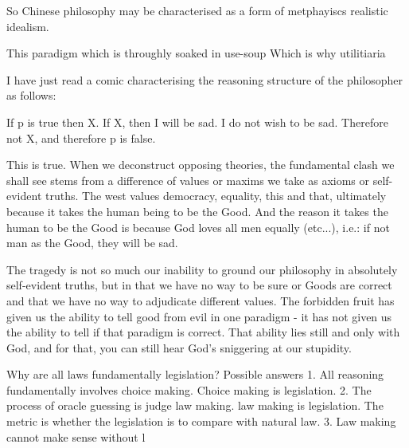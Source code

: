 So Chinese philosophy may be characterised as a form of metphayiscs realistic idealism. 








This paradigm which is throughly soaked in use-soup Which is why utilitiaria





I have just read a comic characterising the reasoning structure of the philosopher as follows: 

If p is true then X. 
If X, then I will be sad. 
I do not wish to be sad. 
Therefore not X, and therefore p is false. 

This is true. When we deconstruct opposing theories, the fundamental clash we shall see stems from a difference of values or maxims we take as axioms or self-evident truths. The west values democracy, equality, this and that, ultimately because it takes the human being to be the Good. And the reason it takes the human to be the Good is because God loves all men equally (etc...), i.e.: if not man as the Good, they will be sad. 

The tragedy is not so much our inability to ground our philosophy in absolutely self-evident truths, but in that we have no way to be sure or Goods are correct and that we have no way to adjudicate different values. The forbidden fruit has given us the ability to tell good from evil in one paradigm - it has not given us the ability to tell if that paradigm is correct. That ability lies still and only with God, and for that, you can still hear God's sniggering at our stupidity. 



Why are all laws fundamentally legislation? 
Possible answers
1. All reasoning fundamentally involves choice making. Choice making is legislation. 
2. The process of oracle guessing is judge law making. law making is legislation. The metric is whether the legislation is to compare with natural law. 
3. Law making cannot make sense without l


